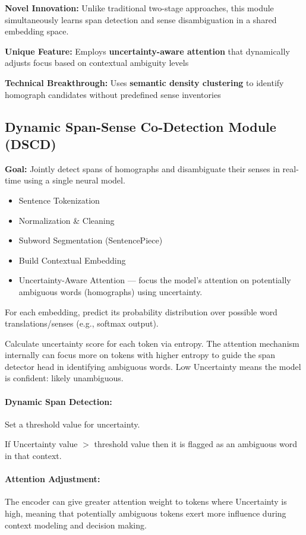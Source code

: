 \documentclass[a4paper,12pt]{article}
\begin{document}
\textbf{Novel Innovation:} Unlike traditional two-stage approaches, this module simultaneously learns span detection and sense disambiguation in a shared embedding space.

\textbf{Unique Feature:} Employs \textbf{uncertainty-aware attention} that dynamically adjusts focus based on contextual ambiguity levels

\textbf{Technical Breakthrough:} Uses \textbf{semantic density clustering} to identify homograph candidates without predefined sense inventories

\subsection*{Dynamic Span-Sense Co-Detection Module (DSCD)}

\textbf{Goal:} Jointly detect spans of homographs and disambiguate their senses in real-time using a single neural model.

\begin{itemize}
    \item Sentence Tokenization
    \item Normalization \& Cleaning
    \item Subword Segmentation (SentencePiece)
    \item Build Contextual Embedding
    \item Uncertainty-Aware Attention --- focus the model’s attention on potentially ambiguous words (homographs) using uncertainty.
\end{itemize}

For each embedding, predict its probability distribution over possible word translations/senses (e.g., softmax output).

Calculate uncertainty score for each token via entropy. The attention mechanism internally can focus more on tokens with higher entropy to guide the span detector head in identifying ambiguous words. Low Uncertainty means the model is confident: likely unambiguous.

\paragraph{Dynamic Span Detection:} Set a threshold value for uncertainty.

If Uncertainty value $>$ threshold value then it is flagged as an ambiguous word in that context.

\paragraph{Attention Adjustment:} The encoder can give greater attention weight to tokens where Uncertainty is high, meaning that potentially ambiguous tokens exert more influence during context modeling and decision making.
\end{document}
